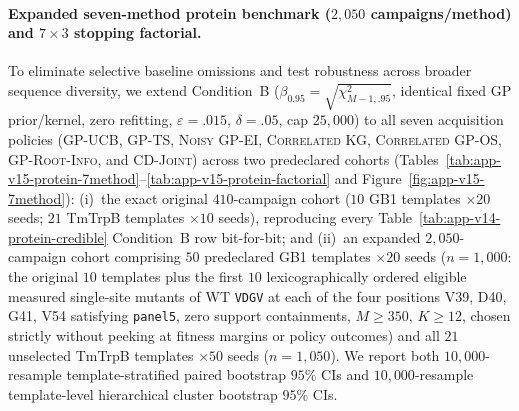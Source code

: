 \documentclass{article}
\theoremstyle{plain}
\theoremstyle{definition}
\begin{document}
\paragraph{Expanded seven-method protein benchmark ($2{,}050$ campaigns/method) and $7\times 3$ stopping factorial.}
To eliminate selective baseline omissions and test robustness across broader sequence diversity, we extend Condition~B ($\beta_{0.95}=\sqrt{\chi^2_{M-1,.95}}$, identical fixed GP prior/kernel, zero refitting, $\varepsilon=.015$, $\delta=.05$, cap $25{,}000$) to all seven acquisition policies (\textsc{GP-UCB}, \textsc{GP-TS}, \textsc{Noisy GP-EI}, \textsc{Correlated KG}, \textsc{Correlated GP-OS}, \textsc{GP-Root-Info}, and \textsc{CD-Joint}) across two predeclared cohorts (Tables~\ref{tab:app-v15-protein-7method}--\ref{tab:app-v15-protein-factorial} and Figure~\ref{fig:app-v15-7method}):
(i)~the exact original $410$-campaign cohort ($10$ GB1 templates $\times 20$ seeds; $21$ TmTrpB templates $\times 10$ seeds), reproducing every Table~\ref{tab:app-v14-protein-credible} Condition~B row bit-for-bit; and
(ii)~an expanded $2{,}050$-campaign cohort comprising $50$ predeclared GB1 templates $\times 20$ seeds ($n=1{,}000$: the original $10$ templates plus the first $10$ lexicographically ordered eligible measured single-site mutants of WT \texttt{VDGV} at each of the four positions V39, D40, G41, V54 satisfying \texttt{panel5}, zero support containments, $M\ge 350$, $K\ge 12$, chosen strictly without peeking at fitness margins or policy outcomes) and all $21$ unselected TmTrpB templates $\times 50$ seeds ($n=1{,}050$).
We report both $10{,}000$-resample template-stratified paired bootstrap $95\%$ CIs and $10{,}000$-resample template-level hierarchical cluster bootstrap $95\%$ CIs.
\end{document}
